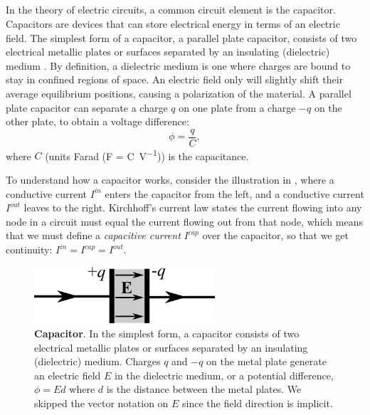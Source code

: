 \subsection{}
\label{sec:Basics:CapacitiveCurrent} 
In the theory of electric circuits, a common circuit element is the capacitor. Capacitors are devices that can store electrical energy in terms of an electric field. The simplest form of a capacitor, a parallel plate capacitor, consists of two electrical metallic plates or surfaces separated by an insulating (dielectric) medium .  By definition, a dielectric medium is one where charges are bound to stay in confined regions of space. An electric field only will slightly shift their average equilibrium positions, causing a polarization of the material. A parallel plate capacitor can separate a charge $q$ on one plate from a charge $-q$ on the other plate, to obtain a voltage difference:
\begin{equation}
\phi = \frac{q}{C}, 
\label{eq:Basics:Vcap}
\end{equation}
where $C$ (units Farad (\si{\farad} = \si{\coulomb\per\volt})) is the capacitance. 

To understand how a capacitor works, consider the illustration in , where a conductive current $I^{in}$ enters the capacitor from the left, and a conductive current $I^{out}$ leaves to the right. Kirchhoff's current law states the current flowing into any node in a circuit must equal the current flowing out from that node, which means that we must define
a \textit{capacitive current} $I^{cap}$ over the capacitor, so that we get continuity: $I^{in} = I^{cap} = I^{out}$. 

\begin{figure}[!ht]
\begin{center}
\includegraphics[width=0.6\textwidth]{Figures/Basics/Capacitor.png}
\end{center}
\caption{{\bf Capacitor}.  In the simplest form, a capacitor consists of two electrical metallic plates or surfaces separated by an insulating (dielectric) medium. Charges $q$ and $-q$ on the metal plate generate an electric field $E$ in the dielectric medium, or a potential difference, $\phi = Ed$ where $d$ is the distance between the metal plates. We skipped the vector notation on $E$ since the field direction is implicit.
}
\label{fig:Basics:Capacitor}
\end{figure}

